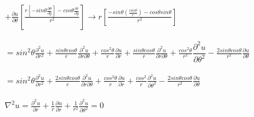 \documentclass[10pt,a4paper]{report}
\begin{document}
\ \\ $\displaystyle
+ \frac{\partial u}{\partial \theta} \left[\frac{r [-sin  \theta \frac{\partial \theta}{\partial y}] - cos \theta \frac{\partial r}{\partial y}}{r^2}\right] \rightarrow r \left[\frac{-sin \theta (\frac{cos \theta}{r}) - cos \theta sin \theta}{r^2}\right]$
\\
\ \\ $\displaystyle
= sin^2 \theta \frac{\partial^2 u}{\partial r^2} + \frac{sin \theta cos \theta}{r} \frac{\partial^2 u}{\partial r \partial \theta} + \frac{cos^2 \theta}{r} \frac{\partial u}{\partial r} + \frac{sin \theta cos \theta}{r} \frac{\partial^2 u}{\partial r \partial \theta} + \frac{cos^2 \theta}{r^2} \dfrac{\partial^2 u}{\partial \theta^2} - \frac{2 sin \theta cos \theta}{r^2} \frac{\partial u}{\partial \theta}$ 
\\
\ \\ $\displaystyle
= sin^2 \theta \frac{\partial^2 u}{\partial r^2} + \frac{2 sin \theta cos \theta}{r} \frac{\partial^2 u}{\partial r \partial \theta} + \frac{cos^2 \theta}{r} \frac{\partial u}{\partial r} + \frac{cos^2}{r} \frac{\partial^2 u}{\partial \theta^2} - \frac{2 sin \theta cos \theta}{r^2} \frac{\partial u}{\partial \theta}$
\\
\ \\ $\displaystyle
\nabla^2 u = \frac{\partial^2 u}{\partial r} + \frac{1}{r} \frac{\partial u}{\partial r} + \frac{1}{r^2} \frac{\partial^2 u}{\partial \theta^2} = 0$
\end{document}
